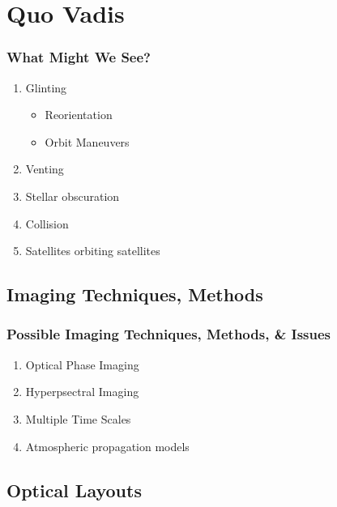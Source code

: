 % 

\section{Quo Vadis}

\begin{frame}\frametitle{What Might We See?}
\begin{enumerate}
	\item Glinting
	\begin{itemize}
		\item Reorientation
		\item Orbit Maneuvers
	\end{itemize}
	\item Venting
	\item Stellar obscuration
	\item Collision
	\item Satellites orbiting satellites
\end{enumerate}
\end{frame}

\subsection{Imaging Techniques, Methods}
\begin{frame}\frametitle{Possible Imaging Techniques, Methods,  \& Issues}
\begin{enumerate}
	\item Optical Phase Imaging
	\item Hyperpsectral Imaging
	\item Multiple Time Scales
	\item Atmospheric propagation models
\end{enumerate}
\end{frame}

\subsection{Optical Layouts}

